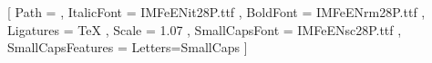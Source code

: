 \setmainfont{IMFeENrm28P.ttf}[
  Path = \fontdir , ItalicFont = IMFeENit28P.ttf ,
  BoldFont = IMFeENrm28P.ttf , Ligatures = TeX , Scale = 1.07 ,
  SmallCapsFont = IMFeENsc28P.ttf ,
  SmallCapsFeatures = {Letters=SmallCaps} ]
\let\caps\realcaps
